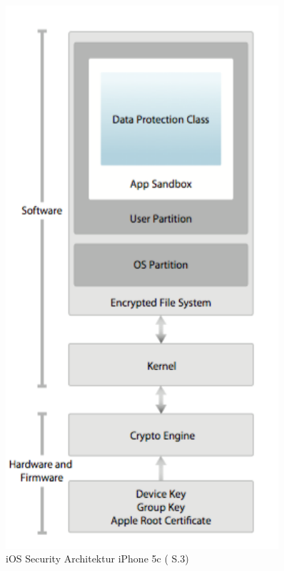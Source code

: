 \begin{figure}[htb]
\begin{minipage}{0.4\textwidth}
		\includegraphics[width=0.9\textwidth]{Bilder/SecArchitektur-iOS7.png}
		\caption {iOS Security Architektur iPhone 5c (\cite{Apple[9]} S.3)}
        \label{fig:iOSSecurityArchitekturiOS7}
	\end{minipage}
\end{figure}

\newpage
